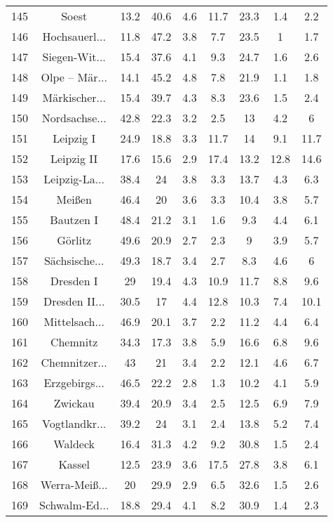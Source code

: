 \begin{table}[!htbp]
\begin{tabular}{@{\extracolsep{5pt}} ccccccccc}
145 & Soest & 13.2 & 40.6 & 4.6 & 11.7 & 23.3 & 1.4 & 2.2 \\ 
146 & Hochsauerl... & 11.8 & 47.2 & 3.8 & 7.7 & 23.5 & 1 & 1.7 \\ 
147 & Siegen-Wit... & 15.4 & 37.6 & 4.1 & 9.3 & 24.7 & 1.6 & 2.6 \\ 
148 & Olpe – Mär... & 14.1 & 45.2 & 4.8 & 7.8 & 21.9 & 1.1 & 1.8 \\ 
149 & Märkischer... & 15.4 & 39.7 & 4.3 & 8.3 & 23.6 & 1.5 & 2.4 \\ 
150 & Nordsachse... & 42.8 & 22.3 & 3.2 & 2.5 & 13 & 4.2 & 6 \\ 
151 & Leipzig I & 24.9 & 18.8 & 3.3 & 11.7 & 14 & 9.1 & 11.7 \\ 
152 & Leipzig II & 17.6 & 15.6 & 2.9 & 17.4 & 13.2 & 12.8 & 14.6 \\ 
153 & Leipzig-La... & 38.4 & 24 & 3.8 & 3.3 & 13.7 & 4.3 & 6.3 \\ 
154 & Meißen & 46.4 & 20 & 3.6 & 3.3 & 10.4 & 3.8 & 5.7 \\ 
155 & Bautzen I & 48.4 & 21.2 & 3.1 & 1.6 & 9.3 & 4.4 & 6.1 \\ 
156 & Görlitz & 49.6 & 20.9 & 2.7 & 2.3 & 9 & 3.9 & 5.7 \\ 
157 & Sächsische... & 49.3 & 18.7 & 3.4 & 2.7 & 8.3 & 4.6 & 6 \\ 
158 & Dresden I & 29 & 19.4 & 4.3 & 10.9 & 11.7 & 8.8 & 9.6 \\ 
159 & Dresden II... & 30.5 & 17 & 4.4 & 12.8 & 10.3 & 7.4 & 10.1 \\ 
160 & Mittelsach... & 46.9 & 20.1 & 3.7 & 2.2 & 11.2 & 4.4 & 6.4 \\ 
161 & Chemnitz & 34.3 & 17.3 & 3.8 & 5.9 & 16.6 & 6.8 & 9.6 \\ 
162 & Chemnitzer... & 43 & 21 & 3.4 & 2.2 & 12.1 & 4.6 & 6.7 \\ 
163 & Erzgebirgs... & 46.5 & 22.2 & 2.8 & 1.3 & 10.2 & 4.1 & 5.9 \\ 
164 & Zwickau & 39.4 & 20.9 & 3.4 & 2.5 & 12.5 & 6.9 & 7.9 \\ 
165 & Vogtlandkr... & 39.2 & 24 & 3.1 & 2.4 & 13.8 & 5.2 & 7.4 \\ 
166 & Waldeck & 16.4 & 31.3 & 4.2 & 9.2 & 30.8 & 1.5 & 2.4 \\ 
167 & Kassel & 12.5 & 23.9 & 3.6 & 17.5 & 27.8 & 3.8 & 6.1 \\ 
168 & Werra-Meiß... & 20 & 29.9 & 2.9 & 6.5 & 32.6 & 1.5 & 2.6 \\ 
169 & Schwalm-Ed... & 18.8 & 29.4 & 4.1 & 8.2 & 30.9 & 1.4 & 2.3 \\ 

\end{tabular}
\end{table}
